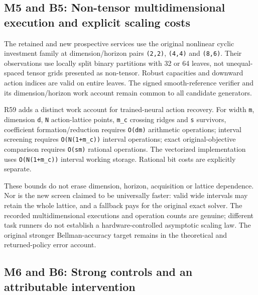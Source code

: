 \documentclass[ecta,nameyear,draft]{econsocart}
\begin{document}
\hypertarget{m5-and-b5-non-tensor-multidimensional-execution-and-explicit-scaling-costs}{%
\subsection{M5 and B5: Non-tensor multidimensional execution and
explicit scaling
costs}\label{m5-and-b5-non-tensor-multidimensional-execution-and-explicit-scaling-costs}}

The retained and new prospective services use the original nonlinear
cyclic investment family at dimension/horizon pairs \nolinkurl{(2,2)},
\nolinkurl{(4,4)} and \nolinkurl{(8,6)}. Their observations use locally split
binary partitions with 32 or 64 leaves, not unequal-spaced tensor grids
presented as non-tensor. Robust capacities and downward action indices
are valid on entire leaves. The signed smooth-reference verifier and its
dimension/horizon work account remain common to all candidate
generators.

R59 adds a distinct work account for trained-neural action recovery. For
width \nolinkurl{m}, dimension \nolinkurl{d}, \nolinkurl{N} action-lattice
points, \nolinkurl{m_c} crossing ridges and \nolinkurl{s} survivors,
coefficient formation/reduction requires \nolinkurl{O(dm)} arithmetic
operations; interval screening requires \nolinkurl{O(N(1+m_c))} interval
operations; exact original-objective comparison requires \nolinkurl{O(sm)}
rational operations. The vectorized implementation uses
\nolinkurl{O(N(1+m_c))} interval working storage. Rational bit costs are
explicitly separate.

These bounds do not erase dimension, horizon, acquisition or lattice
dependence. Nor is the new screen claimed to be universally faster:
valid wide intervals may retain the whole lattice, and a fallback pays
for the original exact solver. The recorded multidimensional executions
and operation counts are genuine; different task runners do not
establish a hardware-controlled asymptotic scaling law. The original
stronger Bellman-accuracy target remains in the theoretical and
returned-policy error account.

\hypertarget{m6-and-b6-strong-controls-and-an-attributable-intervention}{%
\subsection{M6 and B6: Strong controls and an attributable
intervention}\label{m6-and-b6-strong-controls-and-an-attributable-intervention}}
\end{document}
